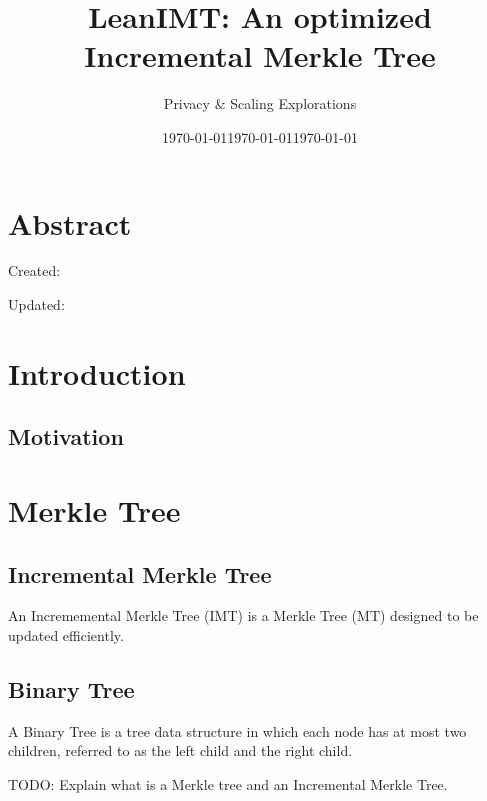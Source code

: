 \documentclass{article}
\title{LeanIMT: An optimized Incremental Merkle Tree}
\author{Privacy \& Scaling Explorations}
\date{\today}
\begin{document}
\maketitle

\section{Abstract}

\newpage
Created: \date{\today}

Updated: \date{\today}

\newpage
\tableofcontents
\newpage

\section{Introduction}

\subsection{Motivation}

\section{Merkle Tree}

\subsection{Incremental Merkle Tree}

An Incrememental Merkle Tree (IMT) is a Merkle Tree (MT) designed to be updated efficiently.

\raggedright

\bigbreak

\subsection{Binary Tree}

A Binary Tree is a tree data structure in which each node has at most two children, referred to as the left child and the right child.

TODO: Explain what is a Merkle tree and an Incremental Merkle Tree.
\end{document}
